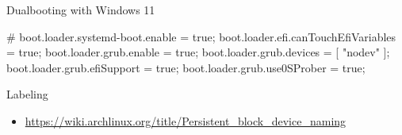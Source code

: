 \begin{frame}[fragile]{Dualbooting with Windows 11}
  \centering
  \begin{terminal}[minted language=nix]
    # boot.loader.systemd-boot.enable = true;
    boot.loader.efi.canTouchEfiVariables = true;
    boot.loader.grub.enable = true;
    boot.loader.grub.devices = [ "nodev" ];
    boot.loader.grub.efiSupport = true;
    boot.loader.grub.use0SProber = true;
  \end{terminal}
\end{frame}

\begin{frame}[fragile]{Labeling}
  \begin{itemize}
    \item \url{https://wiki.archlinux.org/title/Persistent_block_device_naming}
  \end{itemize}
\end{frame}
